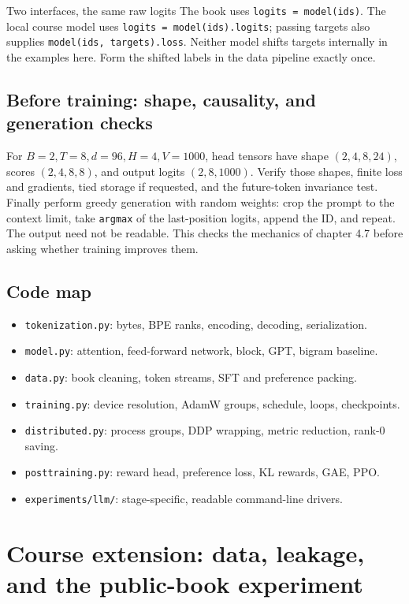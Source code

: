 \documentclass[11pt]{article}
\begin{document}
\begin{studybox}{Two interfaces, the same raw logits}
The book uses \texttt{logits = model(ids)}. The local course model uses
\texttt{logits = model(ids).logits}; passing targets also supplies
\texttt{model(ids, targets).loss}. Neither model shifts targets internally in
the examples here. Form the shifted labels in the data pipeline exactly once.
\end{studybox}

\subsection{Before training: shape, causality, and generation checks}
For $B=2,T=8,d=96,H=4,V=1000$, head tensors have shape $(2,4,8,24)$,
scores $(2,4,8,8)$, and output logits $(2,8,1000)$. Verify those shapes, finite
loss and gradients, tied storage if requested, and the future-token invariance
test. Finally perform greedy generation with random weights: crop the prompt to
the context limit, take \texttt{argmax} of the last-position logits, append the
ID, and repeat. The output need not be readable. This checks the mechanics of
chapter 4.7 before asking whether training improves them.

\subsection*{Code map}
\begin{itemize}
\item \texttt{tokenization.py}: bytes, BPE ranks, encoding, decoding, serialization.
\item \texttt{model.py}: attention, feed-forward network, block, GPT, bigram baseline.
\item \texttt{data.py}: book cleaning, token streams, SFT and preference packing.
\item \texttt{training.py}: device resolution, AdamW groups, schedule, loops, checkpoints.
\item \texttt{distributed.py}: process groups, DDP wrapping, metric reduction, rank-0 saving.
\item \texttt{posttraining.py}: reward head, preference loss, KL rewards, GAE, PPO.
\item \texttt{experiments/llm/}: stage-specific, readable command-line drivers.
\end{itemize}



\section{Course extension: data, leakage, and the public-book experiment}
\label{sec:corpus}
\end{document}
